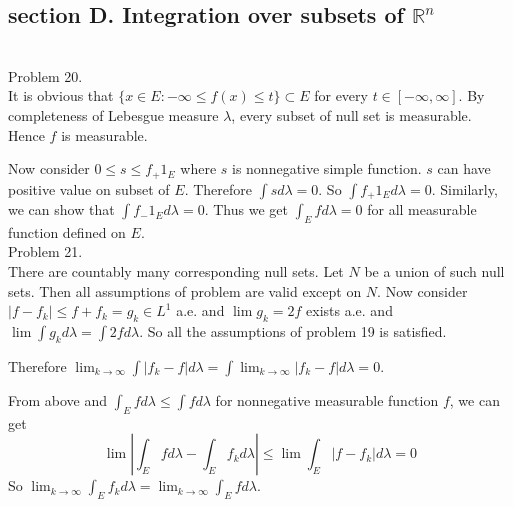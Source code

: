 \subsection*{section D. Integration over subsets of $\mathbb{R}^n$ } \hfill \\

Problem 20. \\

It is obvious that $\{ x \in E : - \infty \leq f(x) \leq t \} \subset E$ for every $t \in \left[ -\infty, \infty \right]$. By completeness of Lebesgue measure $\lambda$, every subset of null set is measurable. Hence $f$ is measurable.

Now consider $0 \leq s \leq f_{+}1_{E}$ where $s$ is nonnegative simple function. $s$ can have positive value on subset of $E$. Therefore $\int s d\lambda = 0$. So $\int f_{+} 1_{E} d\lambda  = 0$. Similarly, we can show that $\int f_{-} 1_{E} d\lambda = 0$. Thus we get $\int _{E} f d\lambda = 0 $ for all measurable function defined on $E$. \\

Problem 21. \\

There are countably many corresponding null sets. Let $N$ be a union of such null sets. Then all assumptions of problem are valid except on $N$.
Now consider $ \left | f - f_k  \right| \leq f + f_k = g_k \in L^1$ a.e. and $\lim g_k = 2f$ exists a.e. and $\lim \int g_k d\lambda = \int 2f d\lambda$. So all the assumptions of problem 19 is satisfied.

Therefore $\lim_{k\rightarrow \infty } \int \left | f_k - f  \right | d\lambda = \int \lim_{k\rightarrow \infty } \left| f_k - f  \right | d\lambda = 0$.

From above and $\int_{E} f d\lambda \leq \int f d\lambda $ for nonnegative measurable function $f$, we can get
\begin{equation*}
	\lim \left| \int_{E} f d\lambda - \int_{E} f_k d\lambda  \right | \leq \lim \int_{E} \left| f- f_k \right| d\lambda = 0
\end{equation*}
So $\lim_{k\rightarrow \infty}\int_{E}f_k d\lambda = \lim _{k\rightarrow \infty}\int_{E}f d\lambda$. \\
